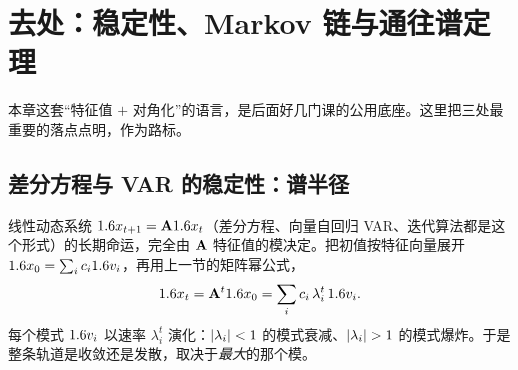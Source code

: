 \section{去处：稳定性、Markov 链与通往谱定理}
\label{sec:eigen-8}

本章这套``特征值 $+$ 对角化''的语言，是后面好几门课的公用底座。这里把三处最重要的落点点明，作为路标。

\subsection*{差分方程与 VAR 的稳定性：谱半径}

线性动态系统 $1.6 x_{t+1}=\mathbf{A}1.6 x_t$（差分方程、向量自回归 VAR、迭代算法都是这个形式）的长期命运，完全由 $\mathbf{A}$ 特征值的模决定。把初值按特征向量展开 $1.6 x_0=\sum_i c_i1.6 v_i$，再用上一节的矩阵幂公式，
\[
    1.6 x_t=\mathbf{A}^t1.6 x_0=\sum_i c_i\,\lambda_i^t\,1.6 v_i .
\]
每个模式 $1.6 v_i$ 以速率 $\lambda_i^t$ 演化：$\left|\lambda_i\right|<1$ 的模式衰减、$\abs{\lambda_i}>1$ 的模式爆炸。于是整条轨道是收敛还是发散，取决于\emph{最大}的那个模。



